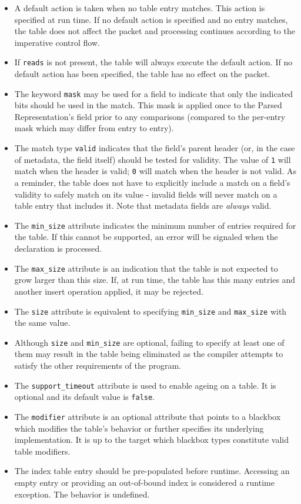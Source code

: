 \documentclass[12pt]{article}
\begin{document}
\begin{itemize}
\item
A default action is taken when no table entry matches.  This action is specified 
at run time. If no default action is specified and no entry matches, the table 
does not affect the packet and processing continues according to the imperative 
control flow.
\item
If \texttt{reads} is not present, the table will always execute the default action. 
If no default action has been specified, the table has no effect on the packet.
\item
The keyword \texttt{mask} may be used for a field to indicate that only the indicated 
bits should be used in the match. This mask is applied once to the Parsed 
Representation's field prior to any comparisons (compared to the per-entry 
mask which may differ from entry to entry).
\item
The match type \texttt{valid} indicates that the field's parent header (or, in the 
case of metadata, the field itself) should be tested for validity.  The value 
of \texttt{1} will match when the header is valid; \texttt{0} will match when the header is 
not valid. As a reminder, the table does not have to explicitly include a 
match on a field's validity to safely match on its value - invalid fields 
will never match on a table entry that includes it. Note that metadata fields 
are \textit{always} valid.
\item
The \texttt{min_size} attribute indicates the minimum number of entries required 
for the table. If this cannot be supported, an error will be signaled when 
the declaration is processed.
\item
The \texttt{max_size} attribute is an indication that the table is not expected to 
grow larger than this size. If, at run time, the table has this many entries 
and another insert operation applied, it may be rejected.
\item
The \texttt{size} attribute is equivalent to specifying \texttt{min_size} and \texttt{max_size} with 
the same value.
\item
Although \texttt{size} and \texttt{min_size} are optional, failing to specify at least one 
of them may result in the table being eliminated as the compiler attempts 
to satisfy the other requirements of the program.
\item
The \texttt{support_timeout} attribute is used to enable ageing on a table. It
is optional and its default value is \texttt{false}.
\item
The \texttt{modifier} attribute is an optional attribute that points to a
blackbox which modifies the table's behavior or further specifies its
underlying implementation. It is up to the target which blackbox types
constitute valid table modifiers.
\item The index table entry should be pre-populated before runtime. Accessing an empty entry or providing an out-of-bound index is considered a runtime exception. The behavior is undefined.  
\end{itemize}
\end{document}
